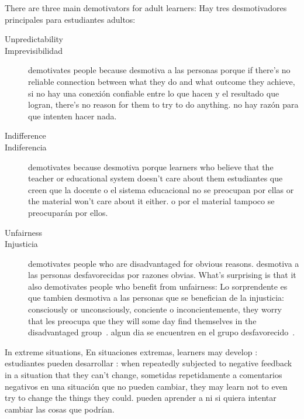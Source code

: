There are three main demotivators for adult learners:
Hay tres desmotivadores principales para estudiantes adultos:

\begin{description}

\item[Unpredictability]
\item[Imprevisibilidad]
  demotivates people because
  desmotiva a las personas porque
  if there's no reliable connection between what they do and what outcome they achieve,
  si no hay una conexión confiable entre lo que hacen y el resultado que logran,
  there's no reason for them to try to do anything.
  no hay razón para que intenten hacer nada.

\item[Indifference]
\item[Indiferencia]
  demotivates because
  desmotiva porque
  learners who believe that the teacher or educational system doesn't care about them
  estudiantes que creen que la docente o el sistema educacional no se preocupan por ellas
  or the material won't care about it either.
  o por el material tampoco se preocuparán por ellos.

\item[Unfairness]
\item[Injusticia]
  demotivates people who are disadvantaged for obvious reasons.
  desmotiva a las personas desfavorecidas por razones obvias.
  What's surprising is that it also demotivates people who benefit from unfairness:
  Lo sorprendente es que tambien desmotiva a las personas que se benefician de la injusticia:
  consciously or unconsciously,
  conciente o inconcientemente,
  they worry that
  les preocupa que
  they will some day find themselves in the disadvantaged group~\cite{Wilk2011}.
  algun dia se encuentren en el grupo desfavorecido~\cite{Wilk2011}.

\end{description}

In extreme situations,
En situaciones extremas,
learners may develop :
estudiantes pueden desarrollar :
when repeatedly subjected to negative feedback in a situation that they can't change,
sometidas repetidamente a comentarios negativos en una situación que no pueden cambiar,
they may learn not to even try to change the things they could.
pueden aprender a ni si quiera intentar cambiar las cosas que podrían.

